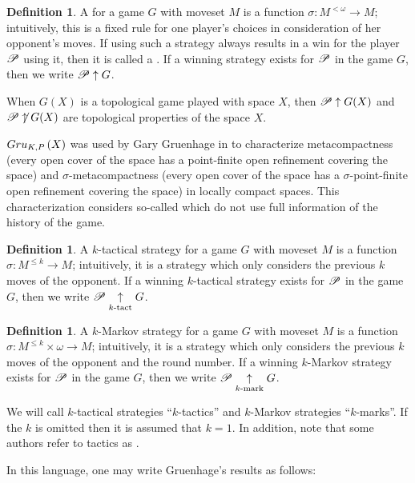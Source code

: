 \documentclass{amsart}
\theoremstyle{definition}
\newtheorem{definition}[theorem]{Definition}
\begin{document}
\begin{definition}
  A  for a game $G$ with moveset $M$ is a function
  $\sigma:M^{<\omega}\to M$; intuitively, this is a fixed rule for one player's
  choices in consideration of her opponent's moves. If using such a strategy
  always results in a win for the player $\mathscr{P}$ using it, then it is called a
  . If a winning strategy exists for $\mathscr{P}$ in the
  game $G$, then we write $\mathscr{P}\uparrow G$.
\end{definition}

When $G(X)$ is a topological game played with space $X$, then $\mathscr{P}\uparrow G(X)$
and $\mathscr{P}\not\uparrow G(X)$ are topological properties of the space $X$.

$Gru_{K,P}\left({X}\right)$ was used by Gary Gruenhage in
\cite{MR858337} to characterize
metacompactness (every open cover of the space has a point-finite open
refinement covering the space) and $\sigma$-metacompactness
(every open cover of the space has a $\sigma$-point-finite open refinement
covering the space) in locally compact spaces. This characterization
considers so-called  which do not use
full information of the history of the game.

\begin{definition}
  A $k$-tactical strategy for a game $G$ with moveset $M$ is a function
  $\sigma:M^{\leq k}\to M$; intuitively, it is a strategy which only considers
  the previous $k$ moves of the opponent. If a winning $k$-tactical strategy
  exists for $\mathscr{P}$ in the game $G$, then we write $\mathscr{P}\underset{k\text{-tact}}{\uparrow} G$.
\end{definition}

\begin{definition}
  A $k$-Markov strategy for a game $G$ with moveset $M$ is a function
  $\sigma:M^{\leq k}\times\omega\to M$; intuitively, it is a strategy which
  only considers the previous $k$ moves of the opponent and the round number.
  If a winning $k$-Markov strategy exists for
  $\mathscr{P}$ in the game $G$, then we write $\mathscr{P}\underset{k\text{-mark}}{\uparrow} G$.
\end{definition}

We will call $k$-tactical strategies ``$k$-tactics'' and $k$-Markov strategies
``$k$-marks''. If the $k$ is omitted then it is assumed that $k=1$. In
addition, note that some authors refer to tactics as
.

In this language, one may write Gruenhage's results as follows:
\end{document}
